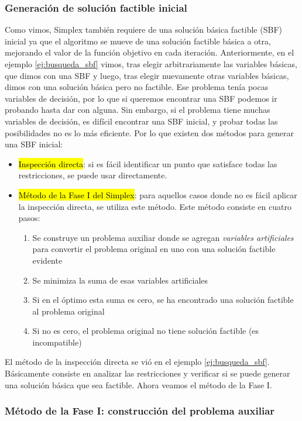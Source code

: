 \subsubsection{Generación de solución factible inicial}

Como vimos, Simplex también requiere de una solución básica factible (SBF) inicial ya que el algoritmo se mueve de una solución factible básica a otra, mejorando el valor de la función objetivo en cada iteración. Anteriormente, en el ejemplo \ref{ej:busqueda_sbf} vimos, tras elegir arbitrariamente las variables básicas, que dimos con una SBF y luego, tras elegir nuevamente otras variables básicas, dimos con una solución básica pero no factible. Ese problema tenía pocas variables de decisión, por lo que si queremos encontrar una SBF podemos ir probando hasta dar con alguna. Sin embargo, si el problema tiene muchas variables de decisión, es difícil encontrar una SBF inicial, y probar todas las posibilidades no es lo más eficiente. Por lo que existen dos métodos para generar una SBF inicial:
\begin{itemize}
  \item \hl{Inspección directa}: si es fácil identificar un punto que satisface todas las restricciones, se puede usar directamente.
  \item \hl{Método de la Fase I del Simplex}: para aquellos casos donde no es fácil aplicar la inspección directa, se utiliza este método. Este método consiste en cuatro pasos:
  \begin{enumerate}
    \item Se construye un problema auxiliar donde se agregan \textit{variables artificiales} para convertir el problema original en uno con una solución factible evidente
    \item Se minimiza la suma de esas variables artificiales
    \item Si en el óptimo esta suma es cero, se ha encontrado una solución factible al problema original
    \item Si no es cero, el problema original no tiene solución factible (es incompatible)
  \end{enumerate}
\end{itemize}

\noindent El método de la inspección directa se vió en el ejemplo \ref{ej:busqueda_sbf}. Básicamente consiste en analizar las restricciones y verificar si se puede generar una solución básica que sea factible. Ahora veamos el método de la Fase I.

\subsubsection{Método de la Fase I: construcción del problema auxiliar}

